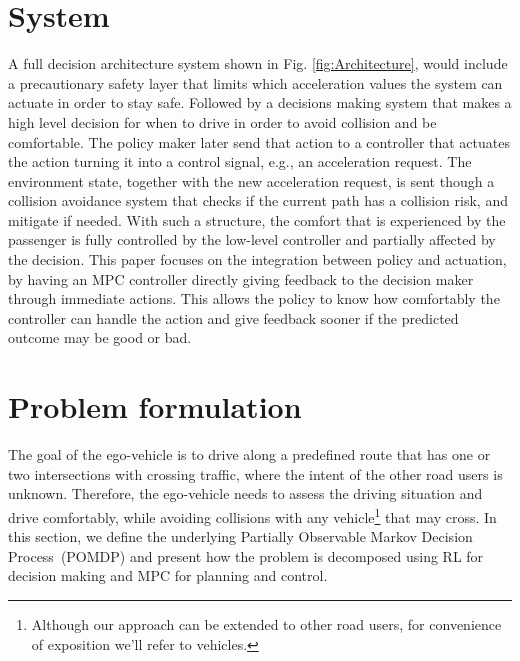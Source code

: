 \section{System}\label{sec:system}
A full decision architecture system shown in Fig. \ref{fig:Architecture}, would include a precautionary safety layer that limits which acceleration values the system can actuate in order to stay safe. Followed by a decisions making system that makes a high level decision for when to drive in order to avoid collision and be comfortable. The policy maker later send that action to a controller that actuates the action turning it into a control signal, e.g., an acceleration request. The environment state, together with the new acceleration request, is sent though a collision avoidance system that checks if the current path has a collision risk, and mitigate if needed. With such a structure, the comfort that is experienced by the passenger is fully controlled by the low-level controller and partially affected by the decision. This paper focuses on the integration between policy and actuation, by having an MPC controller directly giving feedback to the decision maker through immediate actions. This allows the policy to know how comfortably the controller can handle the action and give feedback sooner if the predicted outcome may be good or bad. 
 

\section{Problem formulation}\label{sec:problem}
The goal of the ego-vehicle is to drive along a predefined route that has one or two intersections with crossing traffic, where the intent of the other road users is unknown. Therefore, the ego-vehicle needs to assess the driving situation and drive comfortably, while avoiding collisions with any vehicle\footnote{Although our approach can be extended to other road users, for convenience of exposition we'll refer to vehicles.} that may cross. In this section, we define the underlying Partially Observable Markov Decision Process~(POMDP) and present how the problem is decomposed using RL for decision making and MPC for planning and control.



